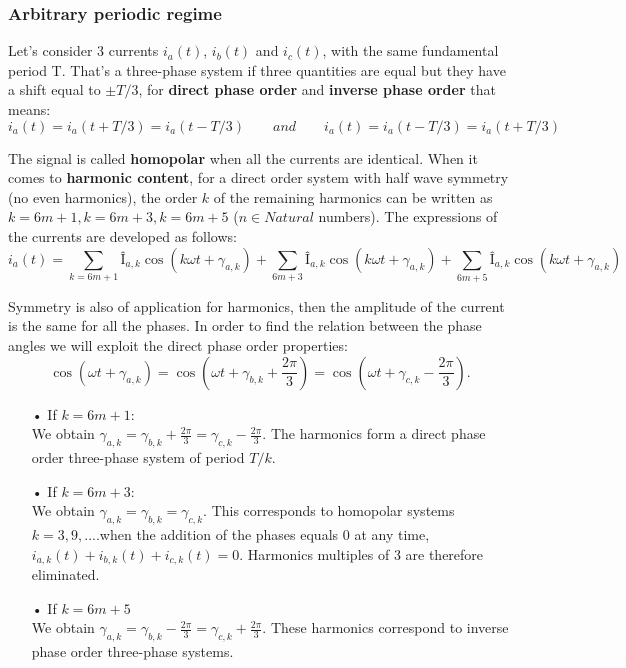 		\subsubsection{Arbitrary periodic regime}
		Let's consider 3 currents $i_a(t)$, $i_b(t)$ and $i_c(t)$, with the same fundamental period T. That's a three-phase system if three quantities are equal but they have a shift equal to $\pm T/3$, for \textbf{direct phase order} and \textbf{inverse phase order} that means:
		\begin{equation}
			i_a(t) = i_a(t+T/3) = i_a(t-T/3) \qquad and \qquad i_a(t) = i_a(t-T/3) = i_a(t+T/3)
		\end{equation}
		
		The signal is called \textbf{homopolar} when all the currents are identical. When it comes to \textbf{harmonic content}, for a direct order system with half wave symmetry (no even harmonics), the order $k$ of the remaining harmonics can be written as $k = 6m+1, k = 6m +3, k= 6m+5$ ($n \in Natural$ numbers). The expressions of the currents are developed as follows: 
		\begin{equation}
			i_a(t) = \sum _{k = 6m+1}Î_{a,k} \cos (k\omega t + \gamma _{a,k})+ \sum _{6m+3}Î_{a,k} \cos (k\omega t + \gamma _{a,k}) + \sum _{6m+5}Î_{a,k} \cos (k\omega t + \gamma _{a,k})
		\end{equation}
		
		Symmetry is also of application for harmonics, then the amplitude of the current is the same for all the phases. In order to find the relation between the phase angles we will exploit the direct phase order properties:
			\begin{equation}
				\cos (\omega t + \gamma _{a,k}) = \cos (\omega t + \gamma _{b,k} + \frac{2\pi}{3}) = \cos (\omega t + \gamma _{c,k} - \frac{2\pi}{3}). 
			\end{equation}
			\begin{itemize}
				\item[•] If $k = 6m+1 :$\\
				We obtain $\gamma _{a,k} = \gamma _{b,k} + \frac{2\pi}{3} = \gamma _{c,k} - \frac{2\pi}{3}$. The harmonics form a direct phase order three-phase system of period $T/k$. 
				\item[•] If $ k = 6m+3 :$\\
				We obtain $\gamma _{a,k} = \gamma _{b,k} = \gamma _{c,k}$. This corresponds to homopolar systems $k = 3, 9, ...$.when the addition of the phases equals 0 at any time, $i_{a,k}(t)+i_{b,k}(t)+i_{c,k}(t) = 0$. Harmonics multiples of 3 are therefore eliminated. 
				\item[•] If $k = 6m+5$\\
				We obtain $\gamma _{a,k} = \gamma _{b,k} -\frac{2\pi}{3} =\gamma _{c,k}+\frac{2\pi}{3}$. These harmonics correspond to inverse phase order three-phase systems. 
				 \newpage
			\end{itemize}
			
